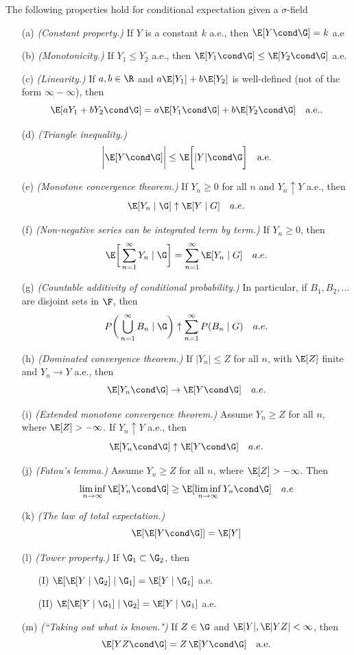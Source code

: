\documentclass{article} %
\begin{document}
\begin{theorem}
The following properties hold for conditional expectation given a $\sigma$-field
\begin{itemize} 
\item[(a)] \textit{(Constant property.)} If $Y$ is a constant $k$ a.e., then $\E[Y \cond \G]=k$  a.e
\item[(b)] \textit{(Monotonicity.)} If $Y_1 \leq Y_2$ a.e., then $\E[Y_1 \cond \G] \leq \E[Y_2 \cond \G]$ a.e.
\item[(c)] \textit{(Linearity.)} If $a,b \in \R$ and $a \E[Y_1] + b \E[Y_2]$ is well-defined (not of the form $\infty-\infty$), then 
\[\E[aY_1 + bY_2 \cond \G] = a \E[Y_1 \cond \G] + b\E[Y_2 \cond \G] \quad \text{a.e.}. \]
\item[(d)] \textit{(Triangle inequality.)} 
\[ \bigg| \E[Y \cond \G]\bigg| \leq \E\bigg[|Y| \cond \G\bigg] \quad \text{a.e.} \]
\item[(e)] \textit{(Monotone convergence theorem.)} If $Y_n \geq 0$ for all $n$ and $Y_n \uparrow Y$ a.e., then 
\[ \E[Y_n \mid \G] \uparrow \E[Y \mid G] \quad a.e. \]
\item[(f)] \textit{(Non-negative series can be integrated term by term.)} If $Y_n \geq 0$, then 
\[ \E \bigg[ \sum_{n=1}^\infty Y_n \mid \G \bigg] = \sum_{n=1}^\infty \E[Y_n \mid G] \quad a.e. \]
\item[(g)] \textit{(Countable additivity of conditional probability.)} In particular, if $B_1, B_2, \hdots$ are disjoint sets in $\F$, then 
\[ P \bigg( \bigcup_{n=1}^\infty B_n \mid \G \bigg) \uparrow \sum_{n=1}^\infty P(B_n \mid G) \quad a.e. \]
\item[(h)] \textit{(Dominated convergence theorem.)} If $|Y_n| \leq Z$ for all $n$, with $\E[Z]$ finite and $Y_n \to Y$ a.e., then
\[ \E[Y_n \cond \G] \to \E[Y \cond \G] \quad a.e.\]
\item[(i)]   \textit{(Extended monotone convergence theorem.)} Assume $Y_n \geq Z$ for all $n$, where $\E[Z] > -\infty$.  If $Y_n \uparrow Y$ a.e., then 
\[ \E[Y_n \cond \G] \uparrow \E[Y \cond \G] \quad a.e.\]
\item[(j)]  \textit{(Fatou's lemma.)} Assume $Y_n \geq Z$ for all $n$, where $\E[Z] > -\infty$. Then
\[ \liminf_{n \to \infty} \E[Y_n \cond \G] \geq \E[\liminf_{n \to \infty} Y_n \cond \G] \quad a.e \]
\item[(k)] \textit{(The law of total expectation.)}
\[ \E[\E[Y \cond \G]] = \E[Y]\]
\item[(l)] \textit{(Tower property.)}
If $\G_1 \subset \G_2$, then 
	\begin{itemize}
	\item[(I)] $\E[\E[Y \mid \G_2] \mid \G_1] = \E[Y \mid \G_1]$ a.e.
	\item[(II)] $\E[\E[Y \mid \G_1] \mid \G_2] = \E[Y \mid \G_1]$ a.e.
	\end{itemize}
\item[(m)] \textit{(``Taking out what is known.")}
If $Z \in \G$ and $\E|Y|, \E|YZ| < \infty$, then 
\[  \E[YZ \cond \G] = Z \, \E[Y \cond \G] \quad \text{a.e.} \]	
\end{itemize}
\label{thm:conditional_expectation_properties}
\end{theorem}
\end{document}
